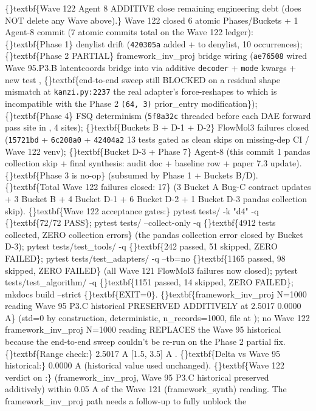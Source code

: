 \documentclass{article}
\begin{document}
\sloppy \{\}textbf\{Wave 122 Agent 8 ADDITIVE  close remaining engineering debt (does NOT delete any Wave above).\} Wave 122 closed 6 atomic Phases/Buckets + 1 Agent-8 commit (7 atomic commits total on the Wave 122 ledger): \{\}textbf\{Phase 1\} denylist drift (\texttt{420305a}  added  +  to  denylist, 10 occurrences); \{\}textbf\{Phase 2 PARTIAL\} framework\_inv\_proj bridge wiring (\texttt{ae76508}  wired Wave 95.P3.B latentcoords bridge into  via additive \texttt{decoder} + \texttt{mode} kwargs + new test , \{\}textbf\{end-to-end sweep still BLOCKED on a residual shape mismatch at \texttt{kanzi.py:2237}  the real adapter's  force-reshapes to  which is incompatible with the Phase 2 \texttt{(64, 3)} prior\_entry modification\}); \{\}textbf\{Phase 4\} FSQ determinism (\texttt{5f8a32c}  threaded  before each DAE forward pass site in , 4 sites); \{\}textbf\{Buckets B + D-1 + D-2\} FlowMol3 failures closed (\texttt{15721bd} + \texttt{6c208a0} + \texttt{42404a2}  13 tests gated as clean skips on missing-dep CI / Wave 122 venv); \{\}textbf\{Bucket D-3 + Phase 7\} Agent-8 (this commit  1 pandas collection skip + final synthesis: audit doc + baseline row + paper 7.3 update). \{\}textbf\{Phase 3 is no-op\} (subsumed by Phase 1 + Buckets B/D). \{\}textbf\{Total Wave 122 failures closed: 17\} (3 Bucket A Bug-C contract updates + 3 Bucket B + 4 Bucket D-1 + 6 Bucket D-2 + 1 Bucket D-3 pandas collection skip). \{\}textbf\{Wave 122 acceptance gates:\} pytest tests/ -k "d4" -q  \{\}textbf\{72/72 PASS\}; pytest tests/ --collect-only -q  \{\}textbf\{4912 tests collected, ZERO collection errors\} (the pandas collection error closed by Bucket D-3); pytest tests/test\_tools/ -q  \{\}textbf\{242 passed, 51 skipped, ZERO FAILED\}; pytest tests/test\_adapters/ -q --tb=no  \{\}textbf\{1165 passed, 98 skipped, ZERO FAILED\} (all Wave 121 FlowMol3 failures now closed); pytest tests/test\_algorithm/ -q  \{\}textbf\{1151 passed, 14 skipped, ZERO FAILED\}; mkdocs build --strict  \{\}textbf\{EXIT=0\}. \{\}textbf\{framework\_inv\_proj N=1000 reading  Wave 95 P3.C historical PRESERVED ADDITIVELY at 2.5017  0.0000 A\} (std=0 by construction, deterministic, n\_records=1000, file at ); no Wave 122 framework\_inv\_proj N=1000 reading REPLACES the Wave 95 historical because the end-to-end sweep couldn't be re-run on the Phase 2 partial fix. \{\}textbf\{Range check:\} 2.5017 A  [1.5, 3.5] A . \{\}textbf\{Delta vs Wave 95 historical:\} 0.0000 A (historical value used unchanged). \{\}textbf\{Wave 122 verdict on :\}  (framework\_inv\_proj, Wave 95 P3.C historical preserved additively)  within 0.05 A of the Wave 121  (framework\_synth) reading. The framework\_inv\_proj path needs a follow-up to fully unblock the 
\end{document}
